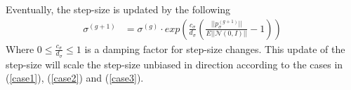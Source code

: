 Eventually, the step-size is updated by the following
\begin{align}
\sigma^{(g+1)} &= \sigma^{(g)} \cdot exp \left( \frac{c_{\sigma}}{d_{\sigma}} \left( \frac{||p_\sigma^{(g+1)}||}{E|| \mathcal{N}(0, I) ||} - 1 \right) \right)
\end{align}
Where $0 \leq \frac{c_\sigma}{d_\sigma} \leq 1$ is a damping factor for step-size changes.
This update of the step-size will scale the step-size unbiased in direction 
according to the cases in 
(\ref{case1}), (\ref{case2}) and (\ref{case3}).









